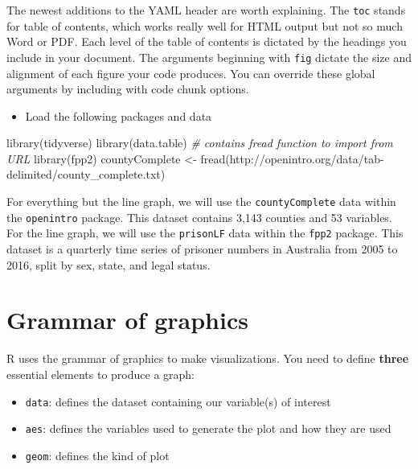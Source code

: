 \documentclass[
]{book}
\makeatletter
\newenvironment{Shaded}{\begin{snugshade}}{\end{snugshade}}
\newcommand{\CommentTok}[1]{\textcolor[rgb]{0.37,0.37,0.37}{\textit{#1}}}
\newcommand{\FunctionTok}[1]{\textcolor[rgb]{0,0,0}{#1}}
\newcommand{\NormalTok}[1]{#1}
\newcommand{\OtherTok}[1]{\textcolor[rgb]{0.37,0.37,0.37}{#1}}
\newcommand{\StringTok}[1]{\textcolor[rgb]{0.5,0.5,0.5}{#1}}
\providecommand{\tightlist}{%
  \setlength{\itemsep}{0pt}\setlength{\parskip}{0pt}}
\newenvironment{kframe}{%
\medskip{}
\setlength{\fboxsep}{.8em}
 \def\at@end@of@kframe{}%
 \ifinner\ifhmode%
  \def\at@end@of@kframe{\end{minipage}}%
  \begin{minipage}{\columnwidth}%
 \fi\fi%
 \def\FrameCommand##1{\hskip\@totalleftmargin \hskip-\fboxsep
 \colorbox{shadecolor}{##1}\hskip-\fboxsep
     \hskip-\linewidth \hskip-\@totalleftmargin \hskip\columnwidth}%
 \MakeFramed {\advance\hsize-\width
   \@totalleftmargin\z@ \linewidth\hsize
   \@setminipage}}%
 {\par\unskip\endMakeFramed%
 \at@end@of@kframe}
\renewenvironment{Shaded}{\begin{kframe}}{\end{kframe}}
\makeatother
\begin{document}
The newest additions to the YAML header are worth explaining. The \texttt{toc} stands for table of contents, which works really well for HTML output but not so much Word or PDF. Each level of the table of contents is dictated by the headings you include in your document. The arguments beginning with \texttt{fig} dictate the size and alignment of each figure your code produces. You can override these global arguments by including with code chunk options.

\begin{itemize}
\tightlist
\item
  Load the following packages and data
\end{itemize}

\begin{Shaded}
\begin{Highlighting}[]
\FunctionTok{library}\NormalTok{(tidyverse)}
\FunctionTok{library}\NormalTok{(data.table) }\CommentTok{\# contains fread function to import from URL}
\FunctionTok{library}\NormalTok{(fpp2)}
\NormalTok{countyComplete }\OtherTok{\textless{}{-}} \FunctionTok{fread}\NormalTok{(}\StringTok{\textquotesingle{}http://openintro.org/data/tab{-}delimited/county\_complete.txt\textquotesingle{}}\NormalTok{)}
\end{Highlighting}
\end{Shaded}

For everything but the line graph, we will use the \texttt{countyComplete} data within the \texttt{openintro} package. This dataset contains 3,143 counties and 53 variables. For the line graph, we will use the \texttt{prisonLF} data within the \texttt{fpp2} package. This dataset is a quarterly time series of prisoner numbers in Australia from 2005 to 2016, split by sex, state, and legal status.

\hypertarget{grammar-of-graphics}{%
\section{Grammar of graphics}\label{grammar-of-graphics}}

R uses the grammar of graphics to make visualizations. You need to define \textbf{three} essential elements to produce a graph:

\begin{itemize}
\tightlist
\item
  \texttt{data}: defines the dataset containing our variable(s) of interest
\item
  \texttt{aes}: defines the variables used to generate the plot and how they are used
\item
  \texttt{geom}: defines the kind of plot
\end{itemize}
\end{document}
